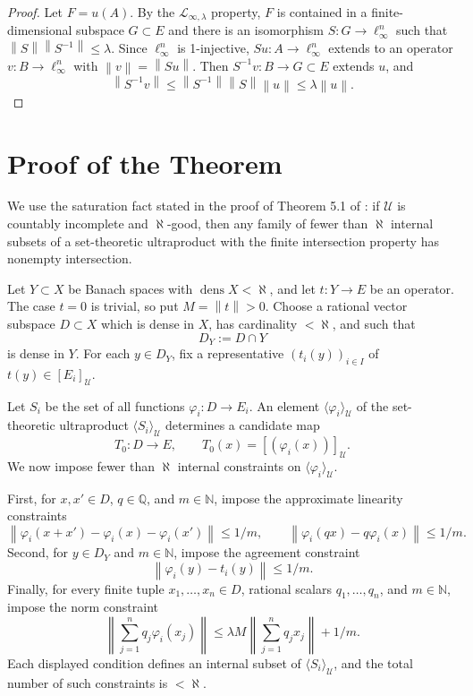\documentclass[11pt]{article}
\newcommand{\U}{\mathcal U}
\newcommand{\dens}{\operatorname{dens}}
\newcommand{\norm}[1]{\left\lVert #1 \right\rVert}
\begin{document}
\begin{proof}
Let \(F=u(A)\).  By the \(\mathcal L_{\infty,\lambda}\) property, \(F\) is
contained in a finite-dimensional subspace \(G\subset E\) and there is an
isomorphism \(S:G\to \ell_\infty^n\) such that
\(\norm S\norm{S^{-1}}\le\lambda\).  Since \(\ell_\infty^n\) is 1-injective,
\(Su:A\to\ell_\infty^n\) extends to an operator \(v:B\to\ell_\infty^n\) with
\(\norm v=\norm{Su}\).  Then \(S^{-1}v:B\to G\subset E\) extends \(u\), and
\[
  \norm{S^{-1}v}
  \le \norm{S^{-1}}\norm S\norm u
  \le \lambda\norm u.
\]
\end{proof}

\section*{Proof of the Theorem}

We use the saturation fact stated in the proof of Theorem 5.1 of
\cite{ACCGM}: if \(\U\) is countably incomplete and \(\aleph\)-good, then any
family of fewer than \(\aleph\) internal subsets of a set-theoretic
ultraproduct with the finite intersection property has nonempty intersection.

Let \(Y\subset X\) be Banach spaces with \(\dens X<\aleph\), and let
\(t:Y\to E\) be an operator.  The case \(t=0\) is trivial, so put
\(M=\norm t>0\).  Choose a rational vector subspace \(D\subset X\) which is
dense in \(X\), has cardinality \(<\aleph\), and such that
\[
  D_Y:=D\cap Y
\]
is dense in \(Y\).  For each \(y\in D_Y\), fix a representative
\((t_i(y))_{i\in I}\) of \(t(y)\in [E_i]_\U\).

Let \(S_i\) be the set of all functions \(\varphi_i:D\to E_i\).  An element
\(\langle \varphi_i\rangle_\U\) of the set-theoretic ultraproduct
\(\langle S_i\rangle_\U\) determines a candidate map
\[
  T_0:D\to E,\qquad T_0(x)=[(\varphi_i(x))]_\U .
\]
We now impose fewer than \(\aleph\) internal constraints on
\(\langle \varphi_i\rangle_\U\).

First, for \(x,x'\in D\), \(q\in\mathbb Q\), and \(m\in\mathbb N\), impose the
approximate linearity constraints
\[
  \norm{\varphi_i(x+x')-\varphi_i(x)-\varphi_i(x')}\le 1/m,
  \qquad
  \norm{\varphi_i(qx)-q\varphi_i(x)}\le 1/m.
\]
Second, for \(y\in D_Y\) and \(m\in\mathbb N\), impose the agreement constraint
\[
  \norm{\varphi_i(y)-t_i(y)}\le 1/m.
\]
Finally, for every finite tuple \(x_1,\ldots,x_n\in D\), rational scalars
\(q_1,\ldots,q_n\), and \(m\in\mathbb N\), impose the norm constraint
\[
  \norm{\sum_{j=1}^n q_j\varphi_i(x_j)}
  \le
  \lambda M \norm{\sum_{j=1}^n q_j x_j}+1/m.
\]
Each displayed condition defines an internal subset of
\(\langle S_i\rangle_\U\), and the total number of such constraints is
\(<\aleph\).
\end{document}
